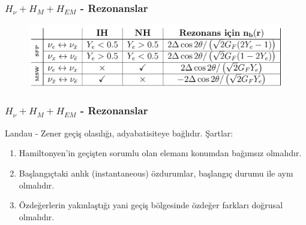 \documentclass[10pt]{beamer}
\begin{document}
\begin{frame}
    \frametitle{$H_{\nu}+ H_{M}+ H_{EM}$ - Rezonanslar}
    \begin{figure}[hbt!]
        \centering
        \includegraphics[width=\textwidth]{fig/rezonanslar.png}
    \end{figure}
\end{frame}

\begin{frame}
    \frametitle{$H_{\nu}+ H_{M}+ H_{EM}$ - Rezonanslar}
    Landau - Zener geçiş olasılığı, adyabatisiteye bağlıdır. Şartlar:
    \scriptsize
    \begin{enumerate}
        \item Hamiltonyen'in geçişten sorumlu olan elemanı konumdan bağımsız olmalıdır.
        \item Başlangıçtaki anlık (instantaneous) özdurumlar, başlangıç durumu ile aynı olmalıdır.
        \item Özdeğerlerin yakınlaştığı yani geçiş bölgesinde özdeğer farkları doğrusal olmalıdır.
    \end{enumerate}
    \normalsize

    \hrulefill


\end{frame}
\end{document}
